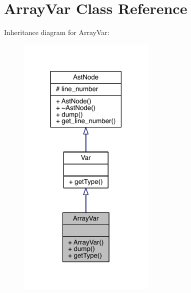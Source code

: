 \hypertarget{class_array_var}{}\section{Array\+Var Class Reference}
\label{class_array_var}


Inheritance diagram for Array\+Var\+:\nopagebreak
\begin{figure}[H]
\begin{center}
\leavevmode
\includegraphics[width=186pt]{class_array_var__inherit__graph}
\end{center}
\end{figure}


